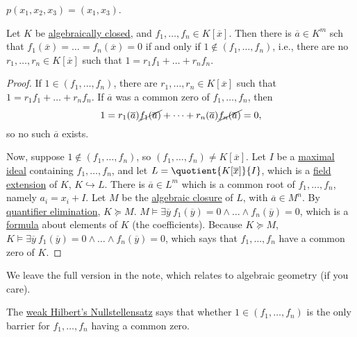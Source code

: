\begin{eg}
	\(p(x_1, x_2, x_3) = (x_1, x_3)\).
\end{eg}

\begin{theorem}\label{thm:weak-Hilbert-Nullstellensatz}
	Let \(K\) be \hyperref[def:algebraically-closed]{algebraically closed}, and \(f_1, \dots , f_n\in K[\overline{x} ]\). Then there is \(\overline{a} \in K^m\) sch that \(f_1(\overline{x} ) = \dots = f_n(\overline{x} ) = 0\) if and only if \(1 \notin (f_1, \dots , f_n)\), i.e., there are no \(r_1, \dots , r_n\in K[\overline{x} ]\) such that \(1 = r_1 f_1 + \dots + r_n f_n\).
\end{theorem}
\begin{proof}
	If \(1\in (f_1, \dots , f_n)\), there are \(r_1, \dots , r_n\in K[\overline{x} ]\) such that \(1 = r_1 f_1 + \dots + r_n f_n\). If \(\overline{a} \) was a common zero of \(f_1, \dots , f_n\), then
	\[
		1 = r_1(\overline{a} ) \cancel{f_1(\overline{a} )} + \dots + r_n(\overline{a} ) \cancel{f_n(\overline{a} )} = 0,
	\]
	so no such \(\overline{a} \) exists.

	Now, suppose \(1 \notin (f_1, \dots , f_n)\), so \((f_1, \dots , f_n) \neq K[\overline{x} ]\). Let \(I\) be a \hyperref[def:maximal]{maximal} \hyperref[def:ideal]{ideal} containing \(f_1, \dots , f_n\), and let \(L = \quotient{K[\overline{x} ]}{I} \), which is a \hyperref[def:field-extension]{field extension} of \(K\), \(K\hookrightarrow L\). There is \(\overline{a} \in L^m\) which is a common root of \(f_1, \dots , f_n\), namely \(a_i = x_i + I\). Let \(M\) be the \hyperref[def:algebraic-closure]{algebraic closure} of \(L\), with \(\overline{a} \in M^n\). By \hyperref[def:quantifier-elimination]{quantifier elimination}, \(K \succeq M\). \(M \models \exists \overline{y} \ f_1(\overline{y} ) = 0 \land \dots \land f_n(\overline{y} ) = 0\), which is a \hyperref[def:formula]{formula} about elements of \(K\) (the coefficients). Because \(K \succeq M\), \(K \models \exists \overline{y} \ f_1(\overline{y} ) = 0 \land \dots \land f_n(\overline{y} ) = 0\), which says that \(f_1, \dots , f_n\) have a common zero of \(K\).
\end{proof}

\begin{note}
	We leave the full version in the note, which relates to algebraic geometry (if you care).
\end{note}

\begin{remark}
	The \hyperref[thm:weak-Hilbert-Nullstellensatz]{weak Hilbert's Nullstellensatz} says that whether \(1\in (f_1, \dots , f_n)\) is the only barrier for \(f_1, \dots , f_n\) having a common zero.
\end{remark}

